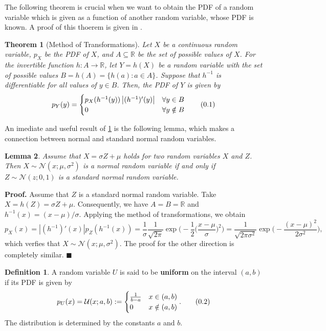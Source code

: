 \documentclass[10pt]{article}
\newtheorem{thm}{Theorem}[section]
\newtheorem{lem}[thm]{Lemma}
\theoremstyle{definition}
\newtheorem{defn}{Definition}[section]
\newenvironment{prf}{\noindent\textbf{Proof.}}{\hfill$\blacksquare$}
\newcommand\eqnum{\addtocounter{equation}{1}\tag{\arabic{section}.\arabic{equation}}}
\begin{document}
The following theorem is crucial when we want to obtain the PDF of a random variable which is given as a function of another random variable, whose PDF is known. A proof of this thoerem is given in \cite{Gharamani2019}.
\begin{thm}[Method of Transformations]\label{thm:MT}
Let $X$ be a continuous random variable, $p_X$ be the PDF of $X$, and $A\subseteq\mathbb{R}$ be the set of possible values of $X$. For the invertible function $h:A\to\mathbb{R}$, let $Y=h(X)$ be a random variable with the set of possible values $B=h(A)=\{h(a): a\in A\}$. Suppose that $h^{-1}$ is differentiable for all values of $y\in B$. Then, the PDF of $Y$  is given by
\begin{equation*}
p_Y(y) = 
\begin{cases}
p_X(h^{-1}(y))\left|(h^{-1})'(y)\right| & \forall y \in B  \\
0 & \forall y \notin B 
\end{cases}
\eqnum
\end{equation*}
\end{thm}
\noindent
An imediate and useful result of \cref{thm:MT} is the following lemma, which makes a connection between normal and standard normal random variables.
\begin{lem}
Assume that $X=\sigma Z + \mu$ holds for two random variables $X$ and $Z$. Then $X\sim\mathcal{N}(x; \mu, \sigma^2)$ is a normal random variable if and only if $Z\sim\mathcal{N}(z; 0, 1)$  is a standard normal random variable.
\end{lem}
\begin{prf}
Assume that $Z$ is a standard normal random variable. Take $X=h(Z)=\sigma Z + \mu$. Consequently, we have $A=B=\mathbb{R}$ and $h^{-1}(x)=(x-\mu)/\sigma$. Applying the method of transformations, we obtain
\begin{equation*}
p_X(x)=|(h^{-1})'(x)|p_Z(h^{-1}(x))
=\frac{1}{\sigma}\frac{1}{\sqrt{2\pi}}\exp\Big(-\frac{1}{2}\Big(\frac{x-\mu}{\sigma}\Big)^2\Big)
=\frac{1}{\sqrt{2\pi\sigma^2}}\exp\Big(-\frac{(x-\mu)^2}{2\sigma^2}\Big),
\end{equation*}
which verfies that  $X\sim\mathcal{N}(x; \mu, \sigma^2)$. The proof for the other direction is completely similar.
\end{prf}
\begin{defn}
A random variable $U$ is said to be \textbf{uniform} on the interval $(a, b)$ if its PDF is given by
\begin{equation*}
p_U(x) = \mathcal{U}(x; a, b) :=
\begin{cases} 
\frac{1}{b-a} & x \in (a, b) \\
0 & x \notin (a, b)
\end{cases}.
\eqnum
\end{equation*}
The distribution is determined by the constants $a$ and $b$. 
\end{defn}
\end{document}
